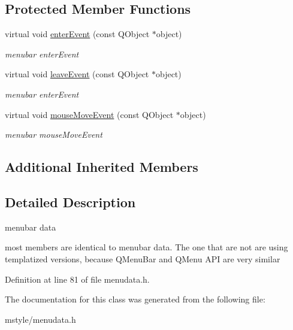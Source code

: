 \subsection*{Protected Member Functions}
\begin{DoxyCompactItemize}
\item 
\mbox{\label{class_menu_data_v2_a5b735e1a5f2bef10ac154c223c6080e5}} 
virtual void \hyperlink{class_menu_data_v2_a5b735e1a5f2bef10ac154c223c6080e5}{enter\+Event} (const Q\+Object $\ast$object)
\begin{DoxyCompactList}\small\item\em menubar enter\+Event \end{DoxyCompactList}\item 
\mbox{\label{class_menu_data_v2_ae1db121ceb9630a27c50b6800224216b}} 
virtual void \hyperlink{class_menu_data_v2_ae1db121ceb9630a27c50b6800224216b}{leave\+Event} (const Q\+Object $\ast$object)
\begin{DoxyCompactList}\small\item\em menubar enter\+Event \end{DoxyCompactList}\item 
\mbox{\label{class_menu_data_v2_a4a8771428c7308bc4d2fcde53fb0303f}} 
virtual void \hyperlink{class_menu_data_v2_a4a8771428c7308bc4d2fcde53fb0303f}{mouse\+Move\+Event} (const Q\+Object $\ast$object)
\begin{DoxyCompactList}\small\item\em menubar mouse\+Move\+Event \end{DoxyCompactList}\end{DoxyCompactItemize}
\subsection*{Additional Inherited Members}


\subsection{Detailed Description}
menubar data 

most members are identical to menubar data. The one that are not are using templatized versions, because Q\+Menu\+Bar and Q\+Menu A\+PI are very similar 

Definition at line 81 of file menudata.\+h.



The documentation for this class was generated from the following file\+:\begin{DoxyCompactItemize}
\item 
mstyle/menudata.\+h\end{DoxyCompactItemize}
